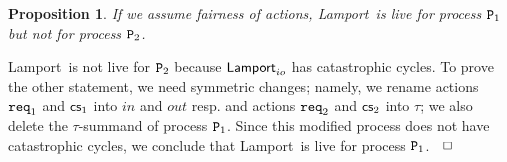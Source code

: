 \documentclass[copyright,creativecommons]{eptcs}
\def\altbox{\hspace{2mm}\nolinebreak\null\nolinebreak\hfill\Box}
\newenvironment{proof}{\noindent {\bf Proof:}}{$\altbox$\bigskip}
\newtheorem{proposition}[theorem]{Proposition}
\newcommand{\req}{{\tt req}}
\newcommand{\cs}{{\sf cs}}
\newcommand{\lamporta}{{\sf Lamport}} \newcommand{\lamportb}{\lamporta}
\newcommand{\proc}{{\tt P}}
\begin{document}
\begin{proposition}\label{prop:lamp-live}
If we assume fairness of actions, \lamporta\ is live for process
$\proc_1$ but {\em not} for process $\proc_2$. 
\end{proposition}

\begin{proof}
\lamporta\ is not live for $\proc_2$ because $\lamporta_{io}$ has
catastrophic cycles. To prove the other statement, we need symmetric
changes; namely, we rename actions $\req_1$ and $\cs_1$ into $in$ and $out$
resp. and actions $\req_2$ and $\cs_2$ into $\tau$; we also delete the
$\tau$-summand of process $\proc_1$. Since this modified process does not
have catastrophic cycles, we conclude that \lamporta\ is live for process
$\proc_1$.
\end{proof}
\end{document}
